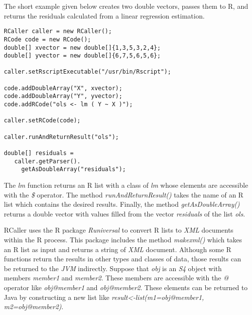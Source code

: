 \documentclass[10pt,a4paper]{article}
\begin{document}
The short example given below creates two double vectors, passes them to R, and returns the residuals calculated from a 
linear regression estimation. 
  
\begin{verbatim}
RCaller caller = new RCaller();
RCode code = new RCode();
double[] xvector = new double[]{1,3,5,3,2,4};
double[] yvector = new double[]{6,7,5,6,5,6};
    
caller.setRscriptExecutable("/usr/bin/Rscript");
    
code.addDoubleArray("X", xvector);
code.addDoubleArray("Y", yvector);
code.addRCode("ols <- lm ( Y ~ X )");
    
caller.setRCode(code);
    
caller.runAndReturnResult("ols");
    
double[] residuals = 
   caller.getParser().
     getAsDoubleArray("residuals");

\end{verbatim}

\noindent The \emph{lm} function returns an R list with a class of \emph{lm} whose elements are accessible with the \emph{\$} operator.
The method \emph{runAndReturnResult()} takes the name of an R list which contains the desired results. Finally, the method
\emph{getAsDoubleArray()} returns a double vector with values filled from the vector \emph{residuals} of the list \emph{ols}. 

RCaller uses the R package \emph{Runiversal} \cite{Satman:2010} to convert R lists to \emph{XML} documents within the R process. This package includes the method \emph{makexml()}
which takes an R list as input and returns a string of \emph{XML} document. Although some R functions return the results in other types and classes
of data, those results can be returned to the \emph{JVM} indirectly. Suppose that \emph{obj} is an \emph{S4} object with members \emph{member1} and \emph{member2}. These members are accessible with
the \emph{@} operator like \emph{obj@member1} and \emph{obj@member2}. These elements can be returned to Java by constructing a new list
like \emph{result<-list(m1=obj@member1, m2=obj@member2)}. 
\end{document}
